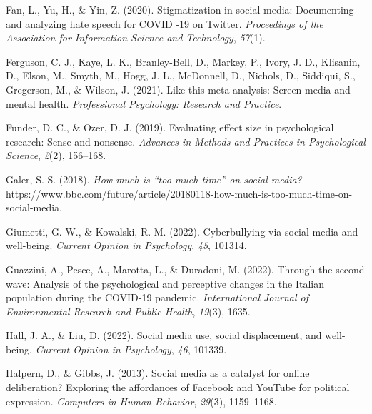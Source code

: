 \documentclass[
  man,mask,floatsintext]{apa7}
\newlength{\cslhangindent}
\newlength{\cslentryspacingunit} %
\newenvironment{CSLReferences}[2] %
 {%
  \setlength{\parindent}{0pt}
  \ifodd #1
  \let\oldpar\par
  \def\par{\hangindent=\cslhangindent\oldpar}
  \fi
  \setlength{\parskip}{#2\cslentryspacingunit}
 }%
 {}
\begin{document}
\begin{CSLReferences}{1}{0}
\leavevmode{}%
Fan, L., Yu, H., \& Yin, Z. (2020). Stigmatization in social media: {Documenting} and analyzing hate speech for {\textsc{COVID}} -19 on {Twitter}. \emph{Proceedings of the Association for Information Science and Technology}, \emph{57}(1).

\leavevmode{}%
Ferguson, C. J., Kaye, L. K., Branley-Bell, D., Markey, P., Ivory, J. D., Klisanin, D., Elson, M., Smyth, M., Hogg, J. L., McDonnell, D., Nichols, D., Siddiqui, S., Gregerson, M., \& Wilson, J. (2021). Like this meta-analysis: {Screen} media and mental health. \emph{Professional Psychology: Research and Practice}.

\leavevmode{}%
Funder, D. C., \& Ozer, D. J. (2019). Evaluating effect size in psychological research: {Sense} and nonsense. \emph{Advances in Methods and Practices in Psychological Science}, \emph{2}(2), 156--168.

\leavevmode{}%
Galer, S. S. (2018). \emph{How much is {``too much time''} on social media?} https://www.bbc.com/future/article/20180118-how-much-is-too-much-time-on-social-media.

\leavevmode{}%
Giumetti, G. W., \& Kowalski, R. M. (2022). Cyberbullying via social media and well-being. \emph{Current Opinion in Psychology}, \emph{45}, 101314.

\leavevmode{}%
Guazzini, A., Pesce, A., Marotta, L., \& Duradoni, M. (2022). Through the second wave: {Analysis} of the psychological and perceptive changes in the {Italian} population during the {COVID-19} pandemic. \emph{International Journal of Environmental Research and Public Health}, \emph{19}(3), 1635.

\leavevmode{}%
Hall, J. A., \& Liu, D. (2022). Social media use, social displacement, and well-being. \emph{Current Opinion in Psychology}, \emph{46}, 101339.

\leavevmode{}%
Halpern, D., \& Gibbs, J. (2013). Social media as a catalyst for online deliberation? {Exploring} the affordances of {Facebook} and {YouTube} for political expression. \emph{Computers in Human Behavior}, \emph{29}(3), 1159--1168.


\end{CSLReferences}
\end{document}

